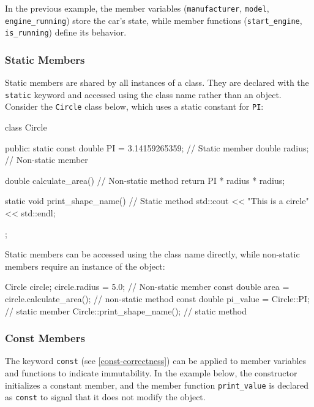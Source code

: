 \vspace{1em}

In the previous example, the member variables (\texttt{manufacturer}, \texttt{model}, \texttt{engine\_running}) store the car's state, while member functions (\texttt{start\_engine}, \texttt{is\_running}) define its behavior.

\subsubsection{Static Members}

Static members are shared by all instances of a class. They are declared with the \texttt{static} keyword and accessed using the class name rather than an object. Consider the \texttt{Circle} class below, which uses a static constant for \texttt{PI}:

\begin{codeblock}[language=C++]
class Circle {
public:
    static const double PI = 3.14159265359;   // Static member
    double radius;                            // Non-static member

    double calculate_area() {                 // Non-static method
        return PI * radius * radius;
    }
    
    static void print_shape_name() {          // Static method
        std::cout << "This is a circle" << std::endl;
    }
};
\end{codeblock}
Static members can be accessed using the class name directly, while non-static members require an instance of the object:

\begin{codeblock}[language=C++, firstnumber=14]
Circle circle;
circle.radius = 5.0;                          // Non-static member
const double area = circle.calculate_area();  // non-static method
const double pi_value = Circle::PI;           // static member
Circle::print_shape_name();                   // static method
\end{codeblock}

\subsubsection{Const Members}

The keyword \texttt{const} (see \cref{const-correctness}) can be applied to member variables and functions to indicate immutability. In the example below, the constructor initializes a constant member, and the member function \texttt{print\_value} is declared as \texttt{const} to signal that it does not modify the object.

